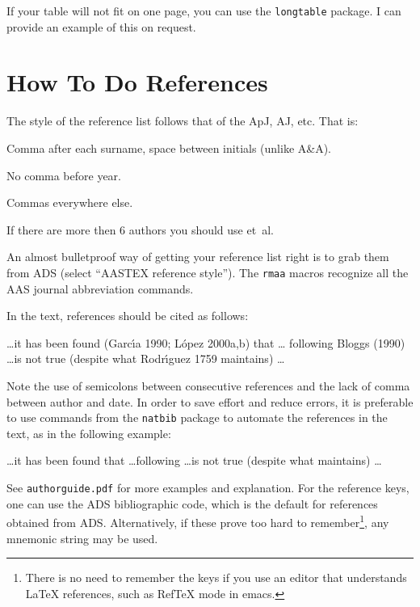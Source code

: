 \documentclass[preprint]{rmxac}
\newenvironment{Example}
{\begin{list}{}{\setlength{\leftmargin}{5pt}\setlength{\rightmargin}{5pt}}\item[]}
  {\end{list}}
\begin{document}
If your table will not fit on one page, you can use the \texttt{longtable}
package. I can provide an example of this on request. 

\section{How To Do References}
\label{sec:refs}

The style of the reference list follows that of the ApJ, AJ, etc. That
is:
\begin{compactitem}
\item Comma after each surname, space between initials (unlike A\&A).
\item No comma before year.
\item Commas everywhere else. 
\item If there are more then 6 authors you should use et~al.
\end{compactitem}
An almost bulletproof way of getting your reference list right is to
grab them from ADS (select ``AASTEX reference style''). The
\texttt{rmaa} macros recognize all the AAS journal abbreviation
commands. 

In the text, references should be cited as follows: 
\begin{Example}
  \dots it has been found (Garc\'\i{}a 1990; L\'opez 2000a,b) that \dots
  following Bloggs (1990) \dots is not true (despite what
  Rodr\'\i{}guez 1759 maintains) \dots
\end{Example}
Note the use of semicolons between consecutive references and the lack
of comma between author and date. In order to save effort and reduce
errors, it is preferable to use commands from the \texttt{natbib}
package to automate the references in the text, as in the following
example:
\begin{Example}
  \dots it has been found \citep{2005astro.ph.11035A,
    1991ApJ...374..580B, 2005MNRAS.358..291D} that \dots following
  \citet{1996ApJ...469..171G} \dots is not true (despite what
  \citealp{1939ApJ....89..526S} maintains) \dots
\end{Example}
See \texttt{authorguide.pdf} for more examples and explanation.  For
the reference keys, one can use the ADS bibliographic code, which is
the default for references obtained from ADS. Alternatively, if these
prove too hard to remember\footnote{There is no need to remember the
  keys if you use an editor that understands \LaTeX{} references, such
  as RefTeX mode in emacs.}, any mnemonic string may be used.
\end{document}
